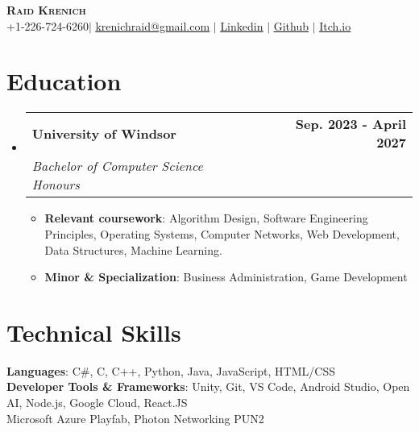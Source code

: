 \documentclass[letterpaper,11pt]{article}
\makeatletter
\newcommand{\resumeItem}[1]{
  \item\small{
    {#1 \vspace{-2pt}}
  }
}
\newcommand{\resumeSubheading}[4]{
  \vspace{-2pt}\item
    \begin{tabular*}{0.97\textwidth}[t]{l@{\extracolsep{\fill}}r}
      \textbf{#1} & #2 \\
      \textit{\small#3} & \textit{\small #4} \\
    \end{tabular*}\vspace{-7pt}
}
\newcommand{\resumeSubHeadingListStart}{\begin{itemize}[leftmargin=0.15in, label={}]}
\newcommand{\resumeSubHeadingListEnd}{\end{itemize}}
\newcommand{\resumeItemListStart}{\begin{itemize}}
\newcommand{\resumeItemListEnd}{\end{itemize}\vspace{-5pt}}
\makeatother
\begin{document}
\begin{center}
    \textbf{\Huge \scshape Raid Krenich} \\ \vspace{1pt}
    \small +1-226-724-6260$|$ \href{mailto:krenichraid@gmail.com}{\underline{krenichraid@gmail.com}} $|$ 
    \href{https://www.linkedin.com/in/raid-krenich-239208253/}{\underline{Linkedin}} $|$
    \href{https://github.com/Krenich09}{\underline{Github}} $|$
    \href{https://rq1d.itch.io/}{\underline{Itch.io}}
\end{center}

%


\section{Education}
  \resumeSubHeadingListStart
    \resumeSubheading
      {University of Windsor}{\textbf{Sep. 2023 - April 2027}}
      {Bachelor of Computer Science Honours}{}
        \resumeItemListStart{}
          \resumeItem{\textbf{Relevant coursework}: Algorithm Design, Software Engineering Principles, Operating Systems, Computer Networks, Web Development, Data Structures, Machine Learning.}
          \resumeItem{\textbf{Minor \& Specialization}: Business Administration, Game Development}
        \resumeItemListEnd
  \resumeSubHeadingListEnd

%
\section{Technical Skills}
 \begin{itemize}[leftmargin=0.15in, label={}]
    \small{\item{
     \textbf{Languages}{: C\#, C, C++, Python, Java, JavaScript, HTML/CSS} \\
     \textbf{Developer Tools \& Frameworks}{: Unity, Git, VS Code, Android Studio, Open AI, Node.js, Google Cloud, React.JS } \\
     \textbf{}{ Microsoft Azure Playfab, Photon Networking PUN2}
    }}
 \end{itemize}
\end{document}
